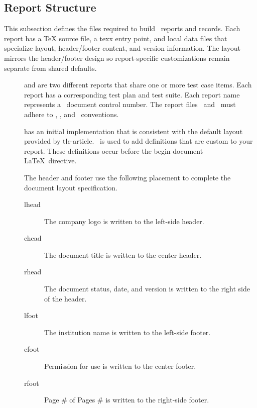 \clearpage
\subsection{Report Structure}


\tlcVspace%

This subsection defines the files required to build \docControl\ reports and
records. Each \gls{report} has a TeX source file, a texx entry point, and local
data files that specialize layout, header/footer content, and version
information. The layout mirrors the header/footer design so report-specific
customizations remain separate from shared defaults.

\tlcVspace%

\begin{description}
  \item[\raName]  and  are two different
    reports that share one or more test case items. Each report has a
    corresponding test plan and test suite. Each report name represents a
    \docControl\ document control number. The report files \faName\ and
    \fbName\ must adhere to \tlcarticle, \autodoc, and \docbld\ conventions.

  \item[\faName] has an initial implementation that is consistent with the
    default layout provided by tlc-article. \faName\ is used to add
    definitions that are custom to your report. These definitions occur before
    the begin document \LaTeX\ directive.

  \item[\fbName] The header and footer use the following placement to complete
    the document layout specification.

  \begin{description}
    \item[lhead] The \gls{company} logo is written to the left-side header.
    \item[chead] The document title is written to the center header.
    \item[rhead] The document status, date, and version is written to the right
      side of the header.
    \item[lfoot] The institution name is written to the left-side footer.
    \item[cfoot] Permission for use is written to the center footer.
    \item[rfoot] Page \# of Pages \# is written to the right-side footer.
  \end{description}


\end{description}
